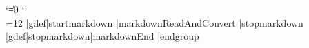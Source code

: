 %
\startmodule[markdown]
\unprotect
\let\startmarkdown\relax
\let\stopmarkdown\relax
\def\markdownInfo#1{\writestatus{markdown}{#1.}}%
\def\markdownWarning#1{\writestatus{markdown\space warn}{#1.}}%
\def\dospecials{\do\ \do\\\do\{\do\}\do\$\do\&%
  \do\#\do\^\do\_\do\%\do\~}%

\def\markdownMakeOther{%
  \count0=128\relax
  \loop
    \catcode\count0=11\relax
    \advance\count0 by 1\relax
  \ifnum\count0<256\repeat
  \catcode`|=12}%
\begingroup
  \catcode`\|=0%
  \catcode`\\=12%
  |gdef|startmarkdown{%
    |markdownReadAndConvert{\stopmarkdown}%
                           {|stopmarkdown}}%
  |gdef|stopmarkdown{|markdownEnd}%
|endgroup
\def\markdownRendererLineBreakPrototype{\blank}%
\def\markdownRendererLeftBracePrototype{\textbraceleft}%
